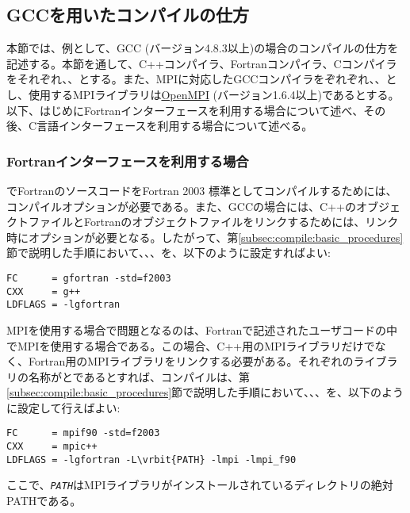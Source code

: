 \subsection{GCCを用いたコンパイルの仕方}
本節では、例として、GCC (バージョン4.8.3以上)の場合のコンパイルの仕方を記述する。本節を通して、C++コンパイラ、Fortranコンパイラ、Cコンパイラをそれぞれ、、とする。また、MPIに対応したGCCコンパイラをぞれぞれ、、とし、使用するMPIライブラリは\href{https://www.open-mpi.org}{OpenMPI} (バージョン1.6.4以上)であるとする。以下、はじめにFortranインターフェースを利用する場合について述べ、その後、C言語インターフェースを利用する場合について述べる。

\subsubsection{Fortranインターフェースを利用する場合}
でFortranのソースコードをFortran 2003 標準としてコンパイルするためには、コンパイルオプションが必要である。また、GCCの場合には、C++のオブジェクトファイルとFortranのオブジェクトファイルをリンクするためには、リンク時にオプションが必要となる。したがって、第\ref{subsec:compile:basic_procedures}節で説明した手順において、、、を、以下のように設定すればよい:
\begin{screen}
\begin{verbatim}
FC      = gfortran -std=f2003
CXX     = g++
LDFLAGS = -lgfortran
\end{verbatim}  
\end{screen}

MPIを使用する場合で問題となるのは、Fortranで記述されたユーザコードの中でMPIを使用する場合である。この場合、C++用のMPIライブラリだけでなく、Fortran用のMPIライブラリをリンクする必要がある。それぞれのライブラリの名称がとであるとすれば、コンパイルは、第\ref{subsec:compile:basic_procedures}節で説明した手順において、、、を、以下のように設定して行えばよい:
\begin{screen}
\begin{Verbatim}[commandchars=\\\{\}]
FC      = mpif90 -std=f2003
CXX     = mpic++
LDFLAGS = -lgfortran -L\vrbit{PATH} -lmpi -lmpi_f90
\end{Verbatim}  
\end{screen}
ここで、\textit{\texttt{PATH}}はMPIライブラリがインストールされているディレクトリの絶対PATHである。

